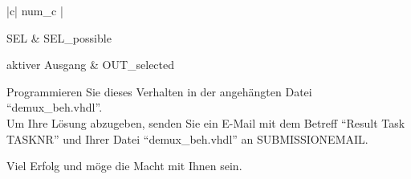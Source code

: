\documentclass[a4paper,12pt]{article}
\newcommand\Tstrut{\rule{0pt}{2.6ex}}       %
\begin{document}
\begin{table}[h!]
\centering
    \begin{tabular}{|c| {{num_c}} |} \hline \Tstrut
		SEL & {{SEL_possible}}  \\ \hline \Tstrut
		aktiver Ausgang & {{OUT_selected}} \\
		\hline
    \end{tabular}
    \caption{aktiver Ausgang in Abh\"angigkeit von SEL}
    \label{tab:SELoutput}
\end{table}

Programmieren Sie dieses Verhalten in der angeh\"angten Datei "`demux\_beh.vhdl"'.\\

Um Ihre L\"osung abzugeben, senden Sie ein E-Mail mit dem Betreff "`Result Task {{TASKNR}}"' und Ihrer Datei "`demux\_beh.vhdl"'  an {{SUBMISSIONEMAIL}}.

\vspace{0.7cm}
Viel Erfolg und m\"oge die Macht mit Ihnen sein.
\end{document}
